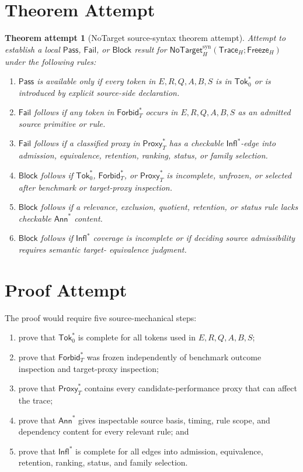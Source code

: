 \documentclass[11pt]{article}
\newcommand{\NoTargetSyn}{\mathsf{NoTarget}_{H}^{\mathrm{syn}}}
\newcommand{\SrcTok}{\mathsf{Tok}_{0}}
\newcommand{\ForbidT}{\mathsf{Forbid}_{T}}
\newcommand{\ProxyT}{\mathsf{Proxy}_{T}}
\newcommand{\TraceH}{\mathsf{Trace}_{H}}
\newcommand{\Annot}{\mathsf{Ann}}
\newcommand{\Influence}{\mathsf{Infl}}
\newcommand{\FreezeH}{\mathsf{Freeze}_{H}}
\newcommand{\Pass}{\mathsf{Pass}}
\newcommand{\Fail}{\mathsf{Fail}}
\newcommand{\Block}{\mathsf{Block}}
\newtheorem{attempt}{Theorem attempt}
\begin{document}
\section{Theorem Attempt}

\begin{attempt}[NoTarget source-syntax theorem attempt]
Attempt to establish a local \(\Pass\), \(\Fail\), or \(\Block\) result for
\(\NoTargetSyn(\TraceH;\FreezeH)\) under the following rules:
\begin{enumerate}
    \item \(\Pass\) is available only if every token in \(E,R,Q,A,B,S\) is
    in \(\SrcTok^{*}\) or is introduced by explicit source-side
    declaration.
    \item \(\Fail\) follows if any token in \(\ForbidT^{*}\) occurs in
    \(E,R,Q,A,B,S\) as an admitted source primitive or rule.
    \item \(\Fail\) follows if a classified proxy in \(\ProxyT^{*}\) has a
    checkable \(\Influence^{*}\)-edge into admission, equivalence,
    retention, ranking, status, or family selection.
    \item \(\Block\) follows if \(\SrcTok^{*}\), \(\ForbidT^{*}\), or
    \(\ProxyT^{*}\) is incomplete, unfrozen, or selected after benchmark or
    target-proxy inspection.
    \item \(\Block\) follows if a relevance, exclusion, quotient,
    retention, or status rule lacks checkable \(\Annot^{*}\) content.
    \item \(\Block\) follows if \(\Influence^{*}\) coverage is incomplete
    or if deciding source admissibility requires semantic target-
    equivalence judgment.
\end{enumerate}
\end{attempt}

\section{Proof Attempt}

The proof would require five source-mechanical steps:

\begin{enumerate}
    \item prove that \(\SrcTok^{*}\) is complete for all tokens used in
    \(E,R,Q,A,B,S\);
    \item prove that \(\ForbidT^{*}\) was frozen independently of benchmark
    outcome inspection and target-proxy inspection;
    \item prove that \(\ProxyT^{*}\) contains every candidate-performance
    proxy that can affect the trace;
    \item prove that \(\Annot^{*}\) gives inspectable source basis, timing,
    rule scope, and dependency content for every relevant rule; and
    \item prove that \(\Influence^{*}\) is complete for all edges into
    admission, equivalence, retention, ranking, status, and family
    selection.
\end{enumerate}
\end{document}
